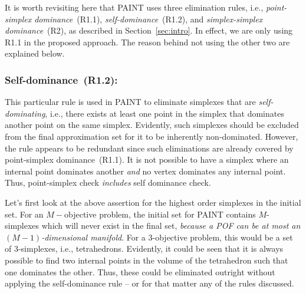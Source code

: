 {\color{blue}
	It is worth revisiting here that PAINT uses three elimination rules, i.e., \emph{point-simplex dominance}~(R1.1), \emph{self-dominance}~(R1.2), and \emph{simplex-simplex dominance}~(R2), as described in Section~\ref{sec:intro}. In effect, we are only using R1.1 in the proposed approach. The reason behind not using the other two are explained below.  
	
	\subsubsection{Self-dominance~(R1.2):} This particular rule is used in PAINT to eliminate simplexes that are \textit{self-dominating}, i.e., there exists at least one point in the simplex that dominates another point on the same simplex. Evidently, such simplexes should be excluded from the final approximation set for it to be inherently non-dominated. However, the rule appears to be redundant since such eliminations are already covered by point-simplex dominance~(R1.1). It is not possible to have a simplex where an internal point dominates another \emph{and} no vertex dominates any internal point. Thus, point-simplex check \emph{includes} self dominance check. 
	
	Let's first look at the above assertion for the highest order simplexes in the initial set. For an $M-$objective problem, the initial set for PAINT contains $M$-simplexes which will never exist in the final set, \textit{because a POF can be at most an $(M-1)$-dimensional manifold}. For a 3-objective problem, this would be a set of 3-simplexes, i.e., tetrahedrons. Evidently, it could be seen that it is always possible to find two internal points in the volume of the tetrahedron such that one dominates the other. Thus, these could be eliminated outright without applying the self-dominance rule -- or for that matter any of the rules discussed. 
	
}
